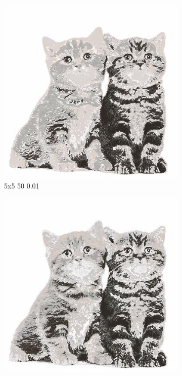\documentclass[12pt,a4paper]{article}
\begin{document}
\begin{figure}[H]
\medskip
\begin{subfigure}{0.25\textwidth}
  \includegraphics[width=\linewidth]{images/big/5-5-50-001}
  \caption{5x5 50 0.01}
  \label{fig:4}
\end{subfigure}\hfil %
\begin{subfigure}{0.25\textwidth}
  \includegraphics[width=\linewidth]{images/big/5-5-255-05}

\end{subfigure}
\end{figure}
\end{document}
